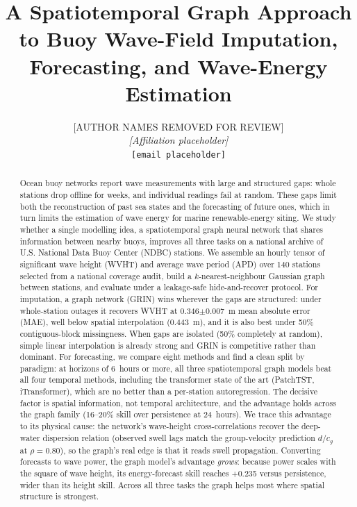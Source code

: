 \documentclass[11pt]{article}
\title{\bfseries A Spatiotemporal Graph Approach to Buoy Wave-Field
Imputation, Forecasting, and Wave-Energy Estimation}
\author{%
[AUTHOR NAMES REMOVED FOR REVIEW]\\
\textit{[Affiliation placeholder]}\\
\texttt{[email placeholder]}}
\date{}
\begin{document}
\maketitle

\begin{abstract}
\noindent
Ocean buoy networks report wave measurements with large and structured gaps:
whole stations drop offline for weeks, and individual readings fail at random.
These gaps limit both the reconstruction of past sea states and the forecasting
of future ones, which in turn limits the estimation of wave energy for marine
renewable-energy siting. We study whether a single modelling idea, a
spatiotemporal graph neural network that shares information between nearby
buoys, improves all three tasks on a national archive of U.S. National Data
Buoy Center (NDBC) stations. We assemble an hourly tensor of significant wave
height (WVHT) and average wave period (APD) over 140 stations selected
from a national coverage audit, build a $k$-nearest-neighbour Gaussian graph
between stations, and evaluate under a leakage-safe hide-and-recover protocol.
For imputation, a graph network (GRIN) wins wherever the gaps are structured:
under whole-station outages it recovers WVHT at 0.346$\pm$0.007~m mean absolute
error (MAE), well below spatial interpolation (0.443~m), and it is also
best under 50\% contiguous-block missingness. When gaps are isolated
(50\% completely at random), simple linear interpolation is already strong and
GRIN is competitive rather than dominant. For forecasting, we compare eight
methods and find a clean split by paradigm: at horizons of 6~hours or more, all
three spatiotemporal graph models beat all four temporal methods, including the
transformer state of the art (PatchTST, iTransformer), which are no better than a
per-station autoregression. The decisive factor is spatial information, not
temporal architecture, and the advantage holds across the graph family (16--20\%
skill over persistence at 24~hours). We trace this advantage to its physical cause:
the network's wave-height cross-correlations recover the deep-water dispersion relation
(observed swell lags match the group-velocity prediction $d/c_g$ at
$\rho=0.80$), so the graph's real edge is that it reads swell propagation.
Converting forecasts to wave power, the graph model's advantage \emph{grows}:
because power scales with the square of wave height, its energy-forecast skill
reaches +0.235 versus persistence, wider than its height skill. Across all
three tasks the graph helps most where spatial structure is strongest.
\end{abstract}
\end{document}
